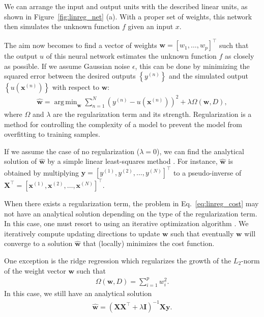 \documentclass[dissertation,nocontribution]{aaltoseries}
\newcommand{\vect}[1]{\mathbf{#1}}
\newcommand{\matr}[1]{\mathbf{#1}}
\newcommand{\vx}[0]{\vect{x}}
\newcommand{\vy}[0]{\vect{y}}
\newcommand{\vw}[0]{\vect{w}}
\newcommand{\mX}[0]{\matr{X}}
\newcommand{\mI}{\matr{I}}
\DeclareMathOperator*{\argmin}{arg\,min}
\begin{document}
We can arrange the input and output units with the described
linear units, as shown in Figure~\ref{fig:linreg_net} (a). With
a proper set of weights, this network then simulates
the unknown function $f$ given an input $x$. 

The aim now becomes to find a vector of weights $\vw = [w_1,
\dots, w_p]^\top$ such that the output $u$ of this neural
network estimates the unknown function $f$ as closely as
possible. If we assume Gaussian noise $\epsilon$, this can
be done by minimizing the squared error between the desired
outputs $\left\{ y^{(n)} \right\}$ and the simulated output
$\left\{ u(\vx^{(n)}) \right\}$ with respect to $\vw$:
\begin{align}
    \label{eq:linreg_cost}
    \hat{\vw} = \argmin_{\vw} \sum_{n=1}^N \left( y^{(n)}
    - u\left(\vx^{(n)}\right) \right)^2 + \lambda \Omega
    \left(\vw, D\right),
\end{align}
where $\Omega$ and $\lambda$ are the regularization term and
its strength. Regularization is a method for controlling the
complexity of a model to prevent the model from overfitting
to training samples.

If we assume the case of no regularization ($\lambda = 0$),
we can find the analytical solution of $\hat{\vw}$ by a
simple linear least-squares method \citep[see,
e.g.,][]{Golub1996}.  For instance, $\hat{\vw}$ is obtained
by multiplying $\vy = \left[y^{(1)}, y^{(2)}, \dots, y^{(N)}
\right]^\top$ to a pseudo-inverse of $\mX^\top = \left[
\vx^{(1)}, \vx^{(2)}, \dots, \vx^{(N)}\right]^\top$. 

When there exists a regularization term, the
problem in Eq.~\eqref{eq:linreg_cost} may not
have an analytical solution depending on the type of the
regularization term. In this case, one must resort to
using an iterative optimization algorithm \citep[see,
e.g.,][]{Fletcher1987}. We iteratively compute updating
directions to update $\vw$ such that eventually $\vw$ will
converge to a solution $\hat{\vw}$ that (locally) minimizes
the cost function.

One exception is the ridge regression which regularizes the
growth of the $L_2$-norm of the weight vector $\vw$ such
that
\begin{align*}
    \Omega(\vw, D) = \sum_{i=1}^p w_i^2.
\end{align*}
In this case, we still have an analytical solution
\begin{align*}
    \hat{\vw} = \left( \mX \mX^\top + \lambda \mI
    \right)^{-1} \mX \vy.
\end{align*}
\end{document}
